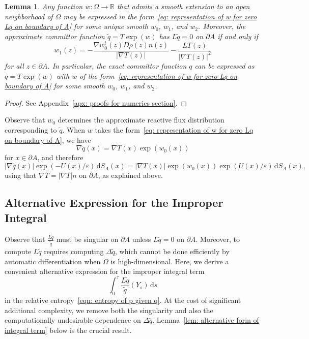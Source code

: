 \documentclass[reqno]{amsart}
\newcommand{\Real}{\mathbb{R}}
\newcommand{\eps}{\varepsilon}
\newcommand{\1}{\mathds{1}}
\renewcommand{\d}{\mathrm{d}}
\newcommand{\grad}{\nabla}
\newcommand{\lap}{\Delta}
\newtheorem{lemma}{Lemma}
\theoremstyle{definition}
\theoremstyle{remark}
\begin{document}
\begin{lemma}\label{lem: boundary condition on w}
  Any function $w: \Omega \rightarrow \Real$ that admits a smooth extension to an open neighborhood of $\overline{\Omega}$ may be expressed in the form~\eqref{eq: representation of w for zero Lq on boundary of A}
  for some unique smooth $w_0$, $w_1$, and $w_2$. Moreover, the approximate committor function $\tilde q = T \exp(w)$ has $L \tilde q = 0$ on $\partial A$ if and only if
  \begin{equation}\label{eq: condition on w1 for Lq to be zero}
     w_1(z) = - \frac{\grad w_0^t(z) D \rho(z) n(z)}{\lvert \grad T(z) \rvert} - \frac{LT(z)}{\lvert \grad T(z) \rvert^2}
   \end{equation}
   for all $z \in \partial A$. In particular, the exact committor function $q$ can be expressed as $q=T\exp(w)$ with $w$ of the form~\eqref{eq: representation of w for zero Lq on boundary of A} for some smooth $w_0$, $w_1$, and $w_2$. 
 \end{lemma}

 \begin{proof}
 See  Appendix~\ref{apx: proofs for numerics section}. 
\end{proof}

Observe that $w_0$ determines the approximate reactive flux distribution corresponding to $\tilde q$. When $w$ takes the form~\eqref{eq: representation of w for zero Lq on boundary of A}, we have 
\begin{equation*}
  \grad \tilde q(x) = \grad T(x) \exp(w_0(x)) 
\end{equation*}
for $x \in \partial A$, and therefore
\begin{equation*}
  \lvert \grad \tilde q(x) \rvert \exp(-U(x)/\eps) \, \d S_A(x) =\lvert \grad T(x) \rvert \exp(w_0(x))\exp(U(x)/\eps) \, \d S_A(x),
\end{equation*}
using that $\grad T = \lvert \grad T \rvert n$ on $\partial A$, as explained above. 

\subsection{Alternative Expression for the Improper Integral}
\label{sec: alternative expression}
Observe that
$
  \frac{L  \tilde q}{\tilde q}
$
must be singular on $\partial A$ unless $L \tilde q =0$ on $\partial A$. Moreover, to compute $L\tilde q$ requires computing $\lap \tilde q$, which cannot be done efficiently by automatic differentiation when $\Omega$ is high-dimensional. 
Here, we derive a convenient alternative expression for the improper integral term
\begin{equation*}
\int_0^\tau  \frac{L  \tilde q}{\tilde q}(Y_s)\, \d s 
\end{equation*}
in the relative entropy~\eqref{eqn: entropy of p given q}. At the cost of significant additional complexity, we remove both the singularity and also the computationally undesirable dependence on $\lap \tilde q$. Lemma~\ref{lem: alternative form of integral term} below is the crucial result.  
\end{document}
